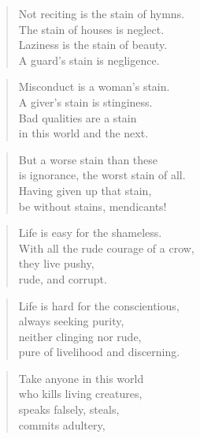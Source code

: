 \documentclass[12pt,openany]{book}%
\begin{document}
\begin{verse}%
Not reciting is the stain of hymns. \\
The stain of houses is neglect. \\
Laziness is the stain of beauty. \\
A guard’s stain is negligence. 

%
\end{verse}

\begin{verse}%
Misconduct is a woman’s stain. \\
A giver’s stain is stinginess. \\
Bad qualities are a stain \\
in this world and the next. 

%
\end{verse}

\begin{verse}%
But a worse stain than these \\
is ignorance, the worst stain of all. \\
Having given up that stain, \\
be without stains, mendicants! 

%
\end{verse}

\begin{verse}%
Life is easy for the shameless. \\
With all the rude courage of a crow, \\
they live pushy, \\
rude, and corrupt. 

%
\end{verse}

\begin{verse}%
Life is hard for the conscientious, \\
always seeking purity, \\
neither clinging nor rude, \\
pure of livelihood and discerning. 

%
\end{verse}

\begin{verse}%
Take anyone in this world \\
who kills living creatures, \\
speaks falsely, steals, \\
commits adultery, 

%
\end{verse}
\end{document}
